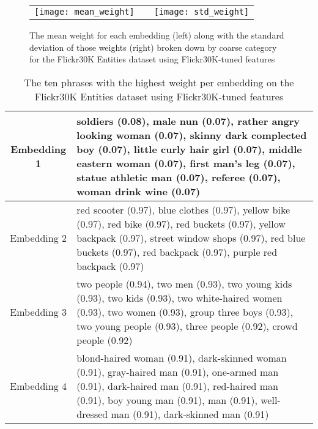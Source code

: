 \documentclass[runningheads]{llncs}
\begin{document}
\smallskip\begin{figure*}[t]
\centering
\begin{tabular}{ccc}
\texttt{[image: mean\_weight]} & \hspace{3cm}&\texttt{[image: std\_weight]}
\end{tabular}
\caption{The mean weight for each embedding (left) along with the standard deviation of those weights (right) broken down by coarse category for the Flickr30K Entities dataset using Flickr30K-tuned features}
\label{fig:weight_graph}
\end{figure*}\begin{table*}[t]
\centering
\caption{The ten phrases with the highest weight per embedding on the Flickr30K Entities dataset using Flickr30K-tuned features}
\label{tab:weight_phrase_list}
\begin{tabular}{|c||p{9.25cm}|}
\hline
Embedding 1 & soldiers (0.08), male nun (0.07), rather angry looking woman (0.07), skinny dark complected boy (0.07), little curly hair girl (0.07), middle eastern woman (0.07), first man's leg (0.07), statue athletic man (0.07), referee (0.07), woman drink wine (0.07)\\
\hline
Embedding 2 & red scooter (0.97), blue clothes (0.97), yellow bike (0.97), red bike (0.97), red buckets (0.97), yellow backpack (0.97), street window shops (0.97), red blue buckets (0.97), red backpack (0.97), purple red backpack (0.97)\\
\hline
Embedding 3 & two people (0.94), two men (0.93), two young kids (0.93), two kids (0.93), two white-haired women (0.93), two women (0.93), group three boys (0.93), two young people (0.93), three people (0.92), crowd people (0.92)\\
\hline
Embedding 4 & blond-haired woman (0.91), dark-skinned woman (0.91), gray-haired man (0.91), one-armed man (0.91), dark-haired man (0.91), red-haired man (0.91), boy young man (0.91), man (0.91), well-dressed man (0.91), dark-skinned man (0.91)\\
\hline
\end{tabular}

\end{table*}
\end{document}
